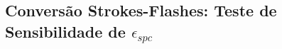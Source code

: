 \begin{anexosenv}

\partanexos

\chapter{Conversão Strokes-Flashes: Teste de Sensibilidade de $\epsilon_{spc}$}
\label{anexo_conversao}


\end{anexosenv}
